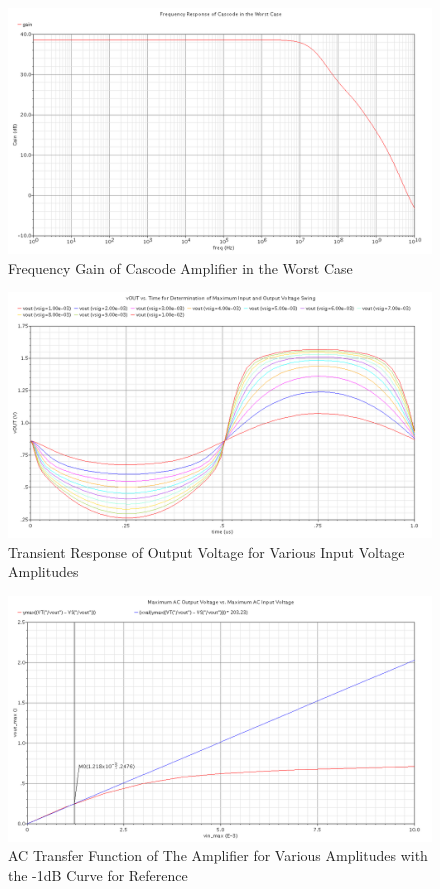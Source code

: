\documentclass{article}
\begin{document}
\begin{figure}[H]
\centering
\includegraphics[width=6in]{2_cas_gain_ss.png}
\caption{Frequency Gain of Cascode Amplifier in the Worst Case}
\label{cas_ss}
\end{figure}

\begin{figure}[H]
\centering
\includegraphics[width=6in]{2_cas_transient.png}
\caption{Transient Response of Output Voltage for Various Input Voltage Amplitudes}
\label{cas_tran}
\end{figure}

\begin{figure}[H]
\centering
\includegraphics[width=6in]{2_cas_linearity.png}
\caption{AC Transfer Function of The Amplifier for Various Amplitudes with the -1dB Curve for Reference}
\label{cas_lin}
\end{figure}
\newpage
\end{document}
